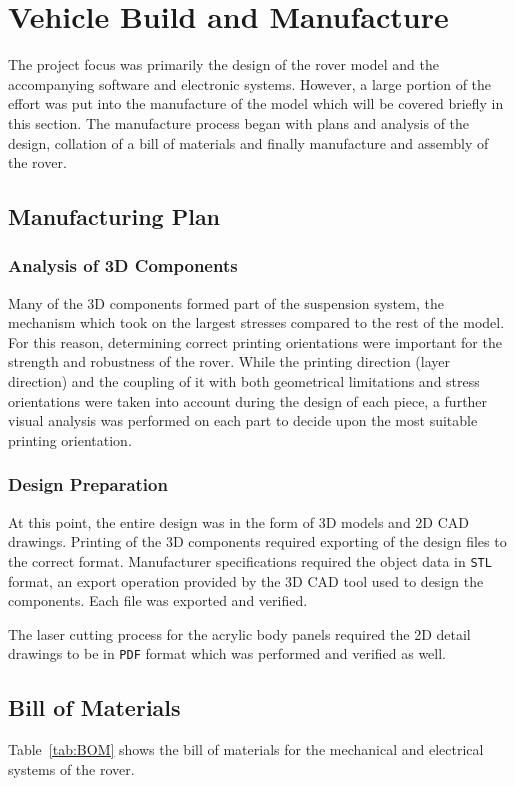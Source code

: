 \section{Vehicle Build and Manufacture}
\label{sec:vehicleBuildAndManufacture}
  The project focus was primarily the design of the rover model and the accompanying software and electronic systems. However, a large portion of the effort was put into the manufacture of the model which will be covered briefly in this section. The manufacture process began with plans and analysis of the design, collation of a bill of materials and finally manufacture and assembly of the rover.
  
  \subsection{Manufacturing Plan}
    \subsubsection{Analysis of 3D Components}
      Many of the 3D components formed part of the suspension system, the mechanism which took on the largest stresses compared to the rest of the model. For this reason, determining correct printing orientations were important for the strength and robustness of the rover. While the printing direction (layer direction) and the coupling of it with both geometrical limitations and stress orientations were taken into account during the design of each piece, a further visual analysis was performed on each part to decide upon the most suitable printing orientation.
      
    \subsubsection{Design Preparation}
      At this point, the entire design was in the form of 3D models and 2D CAD drawings. Printing of the 3D components required exporting of the design files to the correct format. Manufacturer specifications required the object data in \texttt{STL} format, an export operation provided by the 3D CAD tool used to design the components. Each file was exported and verified.
      
      The laser cutting process for the acrylic body panels required the 2D detail drawings to be in \texttt{PDF} format which was performed and verified as well.
    
  \subsection{Bill of Materials}
    Table~\ref{tab:BOM} shows the bill of materials for the mechanical and electrical systems of the rover.
  
